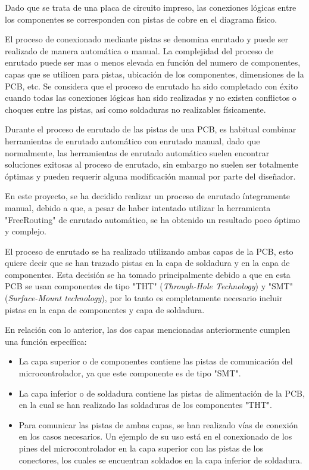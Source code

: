 Dado que se trata de una placa de circuito impreso, las conexiones lógicas entre los componentes se corresponden con pistas de cobre en el diagrama físico.

El proceso de conexionado mediante pistas se denomina enrutado y puede ser realizado de manera automática o manual. La complejidad del proceso de enrutado puede ser mas o menos elevada en función del numero de componentes, capas que se utilicen para pistas, ubicación de los componentes, dimensiones de la PCB, etc. Se considera que el proceso de enrutado ha sido completado con éxito cuando todas las conexiones lógicas han sido realizadas y no existen conflictos o choques entre las pistas, así como soldaduras no realizables físicamente.

Durante el proceso de enrutado de las pistas de una PCB, es habitual combinar herramientas de enrutado automático con enrutado manual, dado que normalmente, las herramientas de enrutado automático suelen encontrar soluciones exitosas al proceso de enrutado, sin embargo no suelen ser totalmente óptimas y pueden requerir alguna modificación manual por parte del diseñador. 

En este proyecto, se ha decidido realizar un proceso de enrutado íntegramente manual, debido a que, a pesar de haber intentado utilizar la herramienta "FreeRouting" de enrutado automático, se ha obtenido un resultado poco óptimo y complejo.

El proceso de enrutado se ha realizado utilizando ambas capas de la PCB, esto quiere decir que se han trazado pistas en la capa de soldadura y en la capa de componentes. Esta decisión se ha tomado principalmente debido a que en esta PCB se usan componentes de tipo "THT" (\textit{Through-Hole Technology}) y "SMT" (\textit{Surface-Mount technology}), por lo tanto es completamente necesario incluir pistas en la capa de componentes y capa de soldadura.

En relación con lo anterior, las dos capas mencionadas anteriormente cumplen una función específica:
\begin{itemize}
    \item La capa superior o de componentes contiene las pistas de comunicación del microcontrolador, ya que este componente es de tipo "SMT".
    \item La capa inferior o de soldadura contiene las pistas de alimentación de la PCB, en la cual se han realizado las soldaduras de los componentes "THT".
    \item Para comunicar las pistas de ambas capas, se han realizado vías de conexión en los casos necesarios. Un ejemplo de su uso está en el conexionado de los pines del microcontrolador en la capa superior con las pistas de los conectores, los cuales se encuentran soldados en la capa inferior de soldadura.
\end{itemize}

